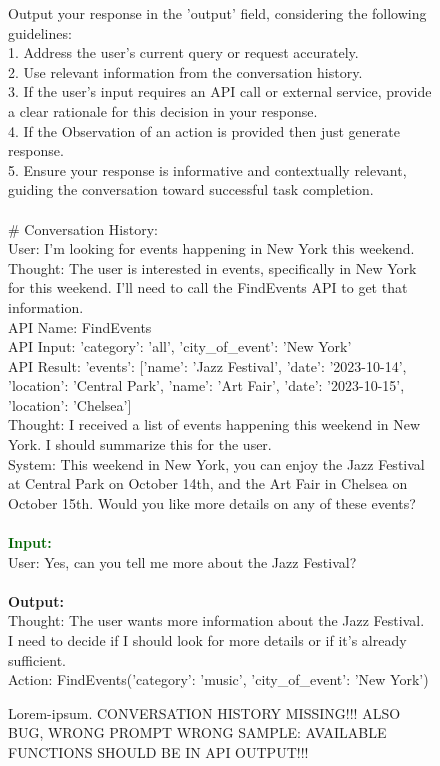 \begin{figure*}[!h]
\begin{tcolorbox}[colback=gray!5!white,colframe=black!95!black,title=\textbf{\small{SGD Instruction Sample} | \textbf{Format:} Action Optimization}]
Output your response in the 'output' field, considering the following guidelines: \\
1. Address the user's current query or request accurately. \\
2. Use relevant information from the conversation history. \\
3. If the user's input requires an API call or external service, provide a clear rationale for this decision in your response. \\
4. If the Observation of an action is provided then just generate response. \\
5. Ensure your response is informative and contextually relevant, guiding the conversation toward successful task completion. \\
 \\
\# Conversation History:\\
User: I'm looking for events happening in New York this weekend.\\
Thought: The user is interested in events, specifically in New York for this weekend. I'll need to call the FindEvents API to get that information. \\
API Name: FindEvents \\
API Input: {'category': 'all', 'city\_of\_event': 'New York'}\\
API Result: {'events': [{'name': 'Jazz Festival', 'date': '2023-10-14', 'location': 'Central Park'}, {'name': 'Art Fair', 'date': '2023-10-15', 'location': 'Chelsea'}]}\\
Thought: I received a list of events happening this weekend in New York. I should summarize this for the user. \\
System: This weekend in New York, you can enjoy the Jazz Festival at Central Park on October 14th, and the Art Fair in Chelsea on October 15th. Would you like more details on any of these events? \\
\\
\small \textcolor{darkgreen}{\textbf{Input:}} \\
User: Yes, can you tell me more about the Jazz Festival? \\
 \\
\small \textcolor{mypurple}{\textbf{Output:}} \\
Thought: The user wants more information about the Jazz Festival. I need to decide if I should look for more details or if it's already sufficient. \\
Action: FindEvents({'category': 'music', 'city\_of\_event': 'New York'})\\
\end{tcolorbox}
\vspace{-0.25cm}
\caption{Lorem-ipsum. CONVERSATION HISTORY MISSING!!! ALSO BUG, WRONG PROMPT WRONG SAMPLE: AVAILABLE FUNCTIONS SHOULD BE IN API OUTPUT!!!}
\label{tab:sgd-sft-action}
\end{figure*}
